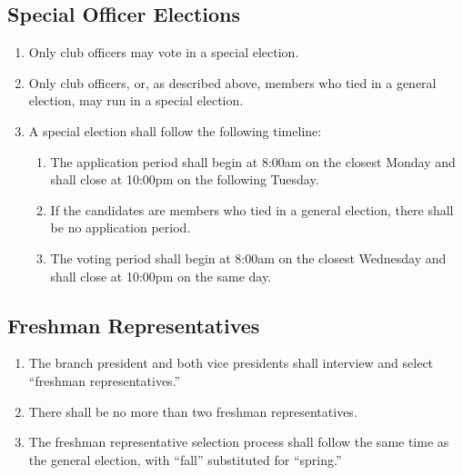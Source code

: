 \documentclass{article}
\begin{document}
\subsection{Special Officer Elections}
\label{sec:special_elections}
\begin{enumerate}
\item Only club officers may vote in a special election.
\item Only club officers, or, as described above, members who tied in a general election, may run in a special election.
\item A special election shall follow the following timeline:
  \begin{enumerate}
  \item The application period shall begin at 8:00am on the closest Monday and shall close at 10:00pm on the following Tuesday.
  \item If the candidates are members who tied in a general election, there shall be no application period.
  \item The voting period shall begin at 8:00am on the closest Wednesday and shall close at 10:00pm on the same day.
  \end{enumerate}
\end{enumerate}

\subsection{Freshman Representatives}
\begin{enumerate}
\item The branch president and both vice presidents shall interview and select ``freshman representatives.''
\item There shall be no more than two freshman representatives.
\item The freshman representative selection process shall follow the same time as the general election, with ``fall'' substituted for ``spring.''
\end{enumerate}
\end{document}
